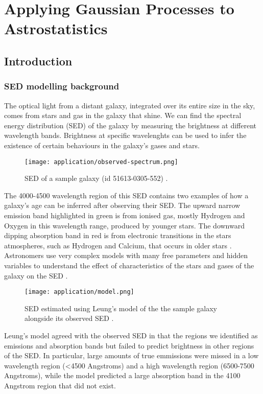 \section{Applying Gaussian Processes to Astrostatistics}
% 
% 
% 
% 
% 
% 
% 
% 


\subsection{Introduction}

\subsubsection{SED modelling background}
The optical light from a distant galaxy, integrated over its entire size in the sky, comes from stars and gas in the galaxy that shine. We can find the spectral energy distribution (SED) of the galaxy by measuring the brightness at different wavelength bands. Brightness at specific wavelenghts can be used to infer the existence of certain behaviours in the galaxy's gases and stars. 

\begin{figure}[H]
	\texttt{[image: application/observed-spectrum.png]}
    \caption{SED of a sample galaxy (id 51613-0305-552) \cite{galaxy-gp-noise}.}
\end{figure}
The 4000-4500 wavelength region of this SED contains two examples of how a galaxy's age can be inferred after observing their SED. The upward narrow emission band highlighted in green is from ionised gas, mostly Hydrogen and Oxygen in this wavelength range, produced by younger stars. The downward dipping absorption band in red is from electronic transitions in the stars atmospheres, such as Hydrogen and Calcium, that occurs in older stars \cite{galaxy-spectra-101}. Astronomers use very complex models with many free parameters and hidden variables to understand the effect of characteristics of the stars and gases of the galaxy on the SED \cite{galaxy-spectra-101}.

\begin{figure}[H]
    \texttt{[image: application/model.png]}
    \caption{SED estimated using Leung's model of the the sample galaxy alongside its observed SED \cite{galaxy-gp-noise}.}
\end{figure}
Leung's model \cite{galaxy-gp-noise} agreed with the observed SED in that the regions we identified as emissions and absorption bands but failed to predict brightness in other regions of the SED. In particular, large amounts of true emmissions were missed in a low wavelength region (<4500 Angstroms) and a high wavelength region (6500-7500 Angstroms), while the model predicted a large absorption band in the 4100 Angstrom region that did not exist.

